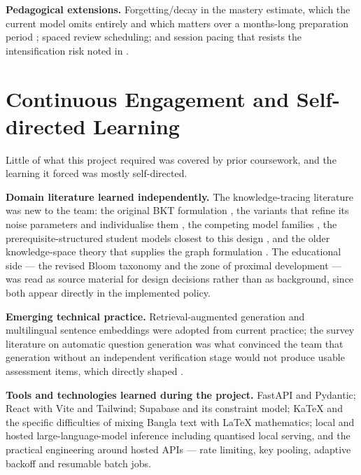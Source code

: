 \textbf{Pedagogical extensions.} Forgetting/decay in the mastery estimate, which
the current model omits entirely and which matters over a months-long
preparation period \cite{ebbinghaus1885memory}; spaced review scheduling; and
session pacing that resists the intensification risk noted in
.

\section{Continuous Engagement and Self-directed Learning}
\label{sec:lessons}

Little of what this project required was covered by prior coursework, and the
learning it forced was mostly self-directed.

\textbf{Domain literature learned independently.} The knowledge-tracing
literature was new to the team: the original BKT formulation
\cite{corbett1995knowledge}, the variants that refine its noise parameters and
individualise them \cite{baker2008more,yudelson2013individualized,pardos2011kt},
the competing model families \cite{cen2006learning,pavlik2009performance,piech2015deep},
the prerequisite-structured student models closest to this design
\cite{kaser2017dynamic}, and the older knowledge-space theory that supplies the
graph formulation \cite{doignon1985spaces,falmagne2011learning}. The educational
side --- the revised Bloom taxonomy \cite{anderson2001revised} and the zone of
proximal development \cite{vygotsky1978mind} --- was read as source material for
design decisions rather than as background, since both appear directly in the
implemented policy.

\textbf{Emerging technical practice.} Retrieval-augmented generation
\cite{lewis2020retrieval} and multilingual sentence embeddings
\cite{reimers2019sentence} were adopted from current practice; the survey
literature on automatic question generation \cite{kurdi2020systematic} was what
convinced the team that generation without an independent verification stage
would not produce usable assessment items, which directly shaped
.

\textbf{Tools and technologies learned during the project.} FastAPI and Pydantic;
React with Vite and Tailwind; Supabase and its constraint model; KaTeX and the
specific difficulties of mixing Bangla text with \LaTeX{} mathematics; local and
hosted large-language-model inference including quantised local serving, and the
practical engineering around hosted APIs --- rate limiting, key pooling, adaptive
backoff and resumable batch jobs.

